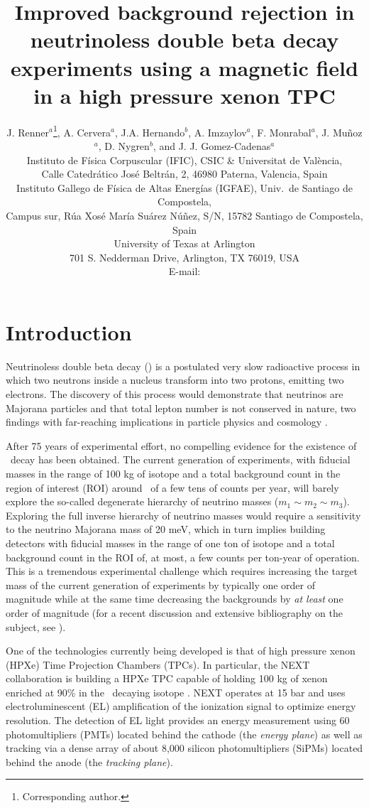 \documentclass{JINST}
\title{Improved background rejection in neutrinoless double beta decay experiments using a magnetic field in a high pressure xenon TPC}
\author{J. Renner$^a$\thanks{Corresponding author.},
A. Cervera$^a$, J.A. Hernando$^b$, A. Imzaylov$^a$, F. Monrabal$^a$, J. Mu\~noz$^a$, D. Nygren$^b$, and J. J. Gomez-Cadenas$^a$\\
\llap{$^a$}Instituto de F\'isica Corpuscular (IFIC), CSIC \& Universitat de Val\`encia,\\ 
Calle Catedr\'atico Jos\'e Beltr\'an, 2, 46980 Paterna, Valencia, Spain\\
\llap{$^b$}Instituto Gallego de F\'isica de Altas Energ\'ias (IGFAE), Univ.\ de Santiago de Compostela,\\ Campus sur, R\'ua Xos\'e Mar\'ia Su\'arez N\'u\~nez, S/N, 15782 Santiago de Compostela, Spain\\
\llap{$^c$}University of Texas at Arlington\\
 701 S. Nedderman Drive, Arlington, TX 76019, USA\\
E-mail: \email{jrenner@ific.uv.es}}
\begin{document}
\section{Introduction}\label{sec:intro}

Neutrinoless double beta decay (\bbonu) is a postulated very slow radioactive process in which two neutrons inside a nucleus transform into two protons, emitting two electrons. The discovery of this process would demonstrate that neutrinos are Majorana particles and that total lepton number is not conserved in nature, two findings with far-reaching implications in particle physics and cosmology \cite{GomezCadenas:2013ue, Cadenas_2012}.

After 75 years of experimental effort, no compelling evidence for the existence of \bbonu\ decay has been obtained. The current generation of experiments, with fiducial masses in the range of 100 kg of isotope and a total background count in the region of interest (ROI) around \Qbb\ of a few tens of counts per year, will barely explore the so-called degenerate hierarchy of neutrino masses ($m_1 \sim m_2 \sim m_3$). Exploring the full inverse hierarchy of neutrino masses would require a sensitivity to the neutrino Majorana mass of 20 meV, which in turn implies building detectors with fiducial masses in the range of one ton of isotope and a total background count in the ROI of, at most, a few counts per ton-year of operation. This is a tremendous experimental challenge which requires increasing the target mass of the current generation of experiments by typically one order of magnitude while at the same time decreasing the backgrounds by {\em at least} one order of magnitude (for a recent discussion and extensive bibliography on the subject, see \cite{Gomez-Cadenas:2015twa}).

One of the technologies currently being developed is that of high pressure xenon (HPXe) Time Projection Chambers (TPCs). In particular, the NEXT collaboration \cite{Gomez-Cadenas:2014dxa} is building a HPXe TPC capable of holding 100 kg of xenon enriched at 90\% in the \bb\ decaying isotope \XE. NEXT operates at 15 bar and uses electroluminescent (EL) amplification of the ionization signal to optimize energy resolution. The detection of EL light provides an energy measurement using 60 photomultipliers (PMTs) located behind the cathode (the \emph{energy plane}) as well as tracking  via a dense array of about 8,000 silicon photomultipliers (SiPMs) located behind the anode (the \emph{tracking plane}).
\end{document}
